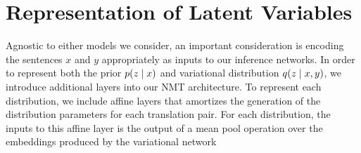 









\section{Representation of Latent Variables}

Agnostic to either models we consider, an important consideration is encoding the sentences $x$ and $y$ appropriately as inputs to our inference networks. In order to represent both the prior $p(z \; | \;{x})$ and variational distribution $q(z \; | \;{x, y})$, we introduce additional layers into our \ac{NMT} architecture. To represent each distribution, we include affine layers that amortizes the generation of the distribution parameters for each translation pair. For each distribution, the inputs to this affine layer is the output of a mean pool operation over the embeddings produced by the variational network

